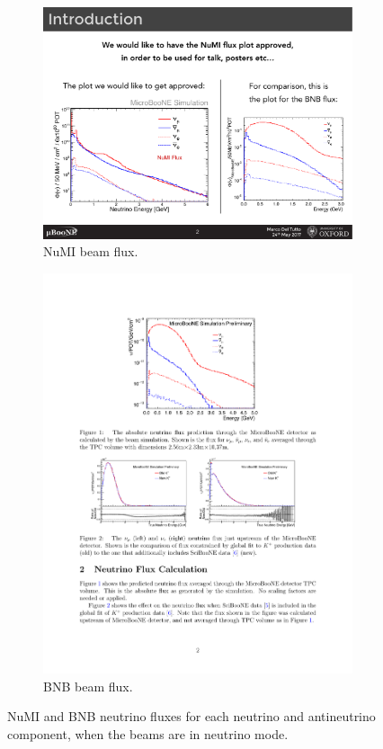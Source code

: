 \begin{figure}[htbp]
\centering
  \begin{subfigure}{0.45\textwidth}
    \includegraphics[width=\linewidth]{figures/numi.pdf}
    \caption{NuMI beam flux.} 
  \end{subfigure}
    \begin{subfigure}{0.45\textwidth}
    \includegraphics[width=\linewidth]{figures/bnbflux.pdf}
    \caption{BNB beam flux.} 
  \end{subfigure}
  \caption{NuMI and BNB neutrino fluxes for each neutrino and antineutrino component, when the beams are in neutrino mode.}\label{fig:numibeam}
\end{figure}

